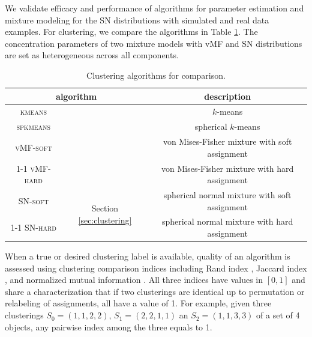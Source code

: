 \documentclass[11pt]{article}
\begin{document}
We validate efficacy and performance of algorithms for parameter estimation and mixture modeling for the SN distributions with simulated and real data examples. For clustering, we compare the algorithms in Table \ref{table:alg_compare}. The concentration parameters of two mixture models with vMF and SN distributions are set as heterogeneous across all components. 
\begin{table}[ht]
	\begin{center}
		\begin{tabular}{|c|c|c|}
			\hline
			\multicolumn{2}{|c|}{algorithm}& description \\ \hline
			\textsc{kmeans} & \cite{macqueen_methods_1967} & $k$-means \\ \hline
			\textsc{spkmeans} & \cite{dhillon_concept_2001} & spherical $k$-means \\ \hline
			\textsc{vMF-soft}    & \multirow{2}{*}{\cite{banerjee_clustering_2005}} & von Mises-Fisher mixture with soft assignment   \\ \cline{1-1} \cline{3-3} 
			\textsc{vMF-hard}    &                   & von Mises-Fisher mixture  with hard assignment   \\ \hline
						\textsc{SN-soft}    & \multirow{2}{*}{Section \ref{sec:clustering}} & spherical normal mixture with soft assignment   \\ \cline{1-1} \cline{3-3} 
			\textsc{SN-hard}    &                   & spherical normal mixture  with hard assignment   \\ \hline
		\end{tabular}
	\end{center}
	\caption{Clustering algorithms for comparison.}
	\label{table:alg_compare}
\end{table}

When a true or desired clustering label is available, quality of an algorithm is assessed using clustering comparison indices including Rand index \citep{rand_objective_1971-2}, Jaccard index \citep{jaccard_distribution_1912-1}, and normalized mutual information \citep{strehl_cluster_2002}. All three indices have values in $[0,1]$ and share a characterization that if two clusterings are identical up to permutation or relabeling of assignments, all have a value of 1. For example, given three clusterings $S_0=(1,1,2,2)$, $S_1=(2,2,1,1)$ an $S_2=(1,1,3,3)$ of a set of 4 objects, any pairwise index among the three equals to 1. 
\end{document}
